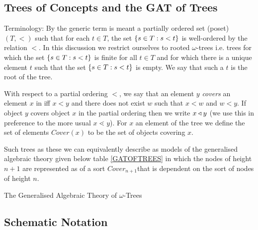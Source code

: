 \subsection {Trees of Concepts and the GAT of Trees}

\renewcommand{\highlight}[1]{#1}  %
 
Terminology: By  the generic term  is meant a partially ordered set (poset) $(T, <)$ such that for each $t \in T$, the set $\left\{s \in T : s < t\right\}$ is well-ordered by the relation $<$.
In this discussion we restrict ourselves to \highlight{rooted $\omega$-trees} i.e. trees for which the set $\left\{s \in T : s < t\right\}$
is finite for all $t \in T$ and for which there is a unique element $t$ such that
 the set $\left\{s \in T : s < t\right\}$ is empty. We say that such a $t$ is the root of the tree.

With respect to a partial ordering $<$, we say that \highlight{an element $y$ \textit{covers}  an element $x$} in  iff $x<y$ and there does not exist $w$ such that $x < w$ and $w < y$.
If object $y$ covers object $x$ in the partial ordering 
then we write \highlight{$x \triangleleft y$} (we use this in preference to the more usual $x \lessdot y$).
For $x$ an element of the tree we define the set of elements  \highlight{$Cover(x)$} to be the set of objects covering $x$.

Such trees as these we can equivalently describe as models of the generalised algebraic theory given below table \ref{GATOFTREES} in which the nodes of height $n+1$ are represented as of a sort $Cover_{n+1}$that is dependent on the sort of nodes of height $n$.

\newcommand{\Ft}[1]{\downarrow \kern -0.325em #1}

\newcommand{\Sz}{Base}
\newcommand{\ofS}[1]{\ofT{#1}{\Sz}}
\newcommand{\Si}[1]{C\kern-1pt over_{#1}}
\newcommand{\ofSi}[3]{\ofT{#1}{\Si{#2}(#3)}}
\vspace{0.03cm} 
\begin{table}[H]
\caption{The Generalised Algebraic Theory of $\omega$-Trees}
\label{GATOFTREES}

\end{table} 

\subsection {Schematic Notation}
\newcommand{\ft}[1]{
#1 \kern-6pt \raisebox{1.1ex}{$\leftrightline$} \kern-3pt \raisebox{.1ex}{$\downarrow$}}
\newcommand{\bbin}[1]{
\raisebox{-0.5em}{$\stackrel{\displaystyle{\in}} {\scriptstyle{#1}}$}
}
\newcommand{\ofTn}[3]{
\raisebox{0.25pt}{$#1$} \bbin{#2} #3}  %

